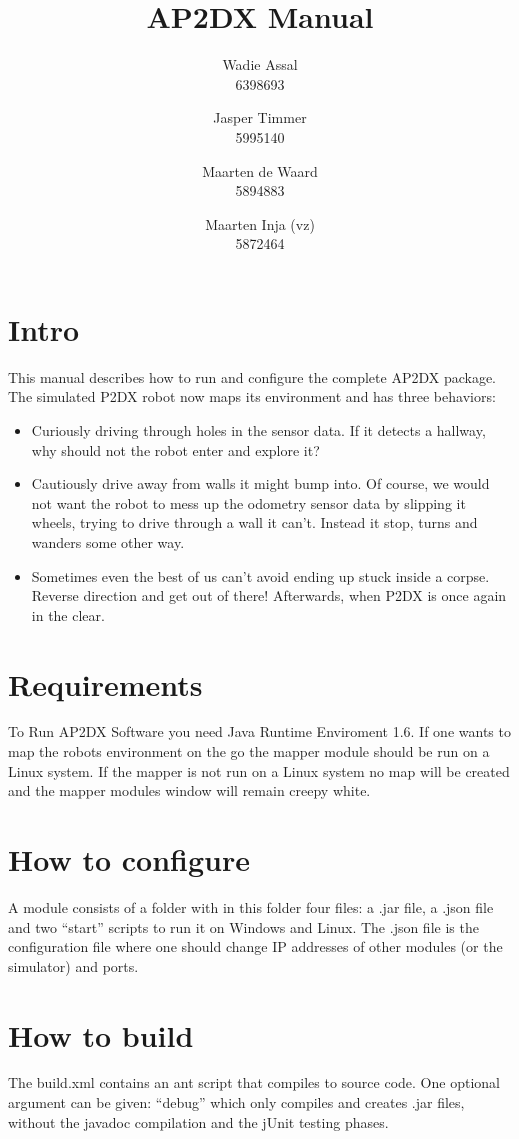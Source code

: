 \documentclass[a4paper, notitlepage]{article}
\title{AP2DX Manual}
\author{Wadie Assal \\ 6398693 \and Jasper Timmer \\ 5995140 \and Maarten de Waard \\ 5894883 \and Maarten Inja (vz) \\ 5872464}
\begin{document}
\maketitle

\section{Intro}
This manual describes how to run and configure the complete AP2DX package. The simulated P2DX robot now maps its environment and has three behaviors: 
\begin{itemize}
\item Curiously driving through holes in the sensor data. If it detects a hallway, why should not the robot enter and explore it? 
\item Cautiously drive away from walls it might bump into. Of course, we would not want the robot to mess up the odometry sensor data by slipping it wheels, 
trying to drive through a wall it can't. Instead it stop, turns and wanders some other way.
\item Sometimes even the best of us can't avoid ending up stuck inside a corpse. Reverse direction and get out of there! Afterwards, 
when P2DX is once again in the clear.
\end{itemize}

\section{Requirements}
To Run AP2DX Software you need Java Runtime Enviroment 1.6. If one wants to map the robots environment on the go 
the mapper module should be run on a Linux system. If the mapper is not run on a Linux system no map will be created
and the mapper modules window will remain creepy white. 

\section{How to configure}
A module consists of a folder with in this folder four files: 
a .jar file, a .json file and two ``start'' scripts to run it on Windows and Linux. The .json file is the configuration 
file where one should change IP addresses of other modules (or the simulator) and ports. 

\section{How to build}
The build.xml contains an ant script that compiles to source code. 
One optional argument can be given: ``debug'' which only compiles and 
creates .jar files, without the javadoc compilation and the jUnit testing phases.
\end{document}
